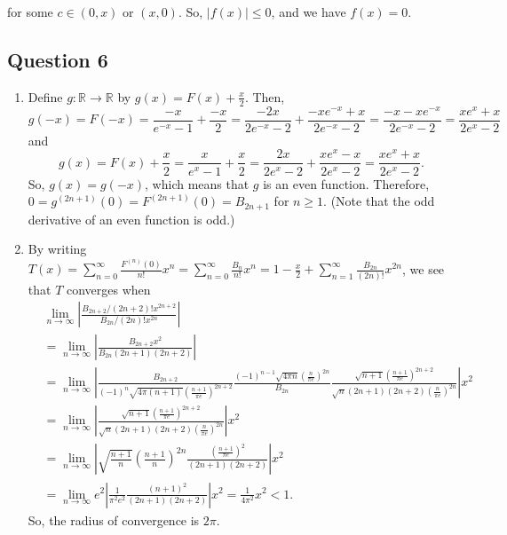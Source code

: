 \documentclass{article}
\newcommand{\R}{\mathbb{R}}
\begin{document}
for some $ c\in (0,x) \text{ or } (x,0)$. So, $|f(x)|\leq 0$, and we have $f(x) = 0$.

\subsection*{Question 6}
\begin{enumerate}[label=\roman*)]
\item Define $g:\R \to \R$ by $g(x)=F(x)+\frac{x}{2}$. Then, $$g(-x)=F(-x)=\frac{-x}{e^{-x}-1}+\frac{-x}{2} 
= \frac{-2x}{2e^{-x}-2}+\frac{-xe^{-x}+x}{2e^{-x}-2} = \frac{-x-xe^{-x}}{2e^{-x}-2} 
= \frac{xe^x+x}{2e^x-2}$$ and $$g(x) = F(x)+\frac{x}{2} = \frac{x}{e^{x}-1}+\frac{x}{2} 
= \frac{2x}{2e^{x}-2}+\frac{xe^{x}-x}{2e^{x}-2} = \frac{xe^{x}+x}{2e^{x}-2}.$$ 
So, $g(x)=g(-x)$, which means that $g$ is an even function. Therefore, $0=g^{(2n+1)}(0)=F^{(2n+1)}(0)=B_{2n+1}$ for $n\geq 1$. (Note that the odd derivative of an even function is odd.)

\item By writing $T(x)= \sum_{n=0}^\infty \frac{F^{(n)}(0)}{n!}x^n = 
\sum_{n=0}^\infty \frac{B_n}{n!}x^n = 1 - \frac{x}{2} + \sum_{n=1}^\infty \frac{B_{2n}}{(2n)!}x^{2n}$, 
we see that $T$ converges when 
\begin{align*}
    &\lim_{n\to\infty}\left| \frac{B_{2n+2}/(2n+2)!x^{2n+2}}{B_{2n}/(2n)!x^{2n}} \right| \\
    &= \lim_{n\to\infty}\left| \frac{B_{2n+2}x^2}{B_{2n}(2n+1)(2n+2)} \right|\\ 
    &= \lim_{n\to\infty}\left| \frac{B_{2n+2}}{(-1)^n\sqrt{4\pi (n+1)} 
    \left(\frac{n+1}{\pi e}\right)^{2n+2} }
    \frac{(-1)^{n-1}\sqrt{4\pi n} \left( \frac{n}{\pi e}\right)^{2n} }{B_{2n}} 
    \frac{\sqrt{n+1} \left(\frac{n+1}{\pi e}\right)^{2n+2}}
    {\sqrt{n}  (2n+1)(2n+2)\left(\frac{n}{\pi e}\right)^{2n} }\right| x^2\\
    &= \lim_{n\to\infty}\left| 
    \frac{\sqrt{n+1} \left(\frac{n+1}{\pi e}\right)^{2n+2}}
    {\sqrt{n} (2n+1)(2n+2)\left( \frac{n}{\pi e}\right)^{2n} }\right| x^2\\
    &= \lim_{n\to\infty}\left| 
    \sqrt{\frac{n+1}{n}}
    \left(\frac{n+1}{n}\right)^{2n}
    \frac{ \left(\frac{n+1}{\pi e}\right)^2}
    {(2n+1)(2n+2) }\right| x^2\\
    &= \lim_{n\to\infty}e^2\left| \frac{1}{\pi^2 e^2}
    \frac{ \left(n+1\right)^2}
    {(2n+1)(2n+2) }\right| x^2
    = \frac{1}{4\pi^2} x^2<1.
\end{align*}
So, the radius of convergence is $2\pi$.


\end{enumerate}
\end{document}
